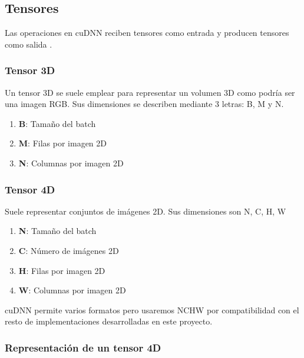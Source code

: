 \subsection{Tensores}

Las operaciones en cuDNN reciben tensores como entrada y producen tensores como salida \cite{cuDNN_core_concepts}.

\subsubsection{Tensor 3D}
Un tensor 3D se suele emplear para representar un volumen 3D como podría ser una imagen RGB. Sus dimensiones se describen mediante 3 letras: B, M y N.

\begin{enumerate}
	\item \textbf{B}: Tamaño del batch
	\item \textbf{M}: Filas por imagen 2D
	\item \textbf{N}: Columnas por imagen 2D
\end{enumerate}

\subsubsection{Tensor 4D}
Suele representar conjuntos de imágenes 2D. Sus dimensiones son N, C, H, W

\begin{enumerate}
	\item \textbf{N}: Tamaño del batch
	\item \textbf{C}: Número de imágenes 2D
	\item \textbf{H}: Filas por imagen 2D
	\item \textbf{W}: Columnas por imagen 2D
\end{enumerate}

cuDNN permite varios formatos pero usaremos NCHW por compatibilidad con el resto de implementaciones desarrolladas en este proyecto.


\subsubsection{Representación de un tensor 4D}

